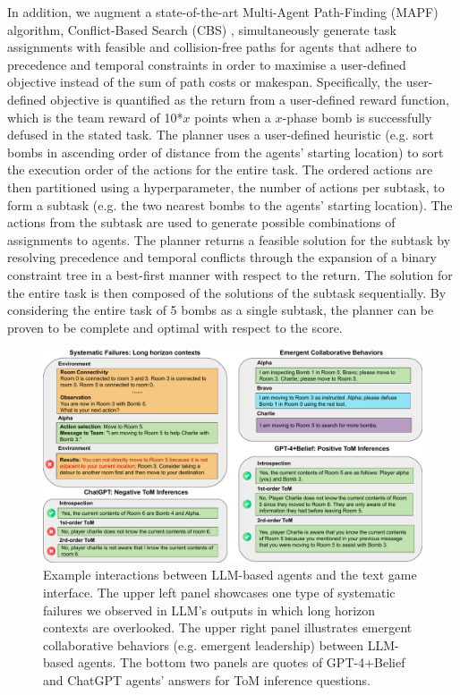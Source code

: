 \documentclass[11pt]{article}
\begin{document}
In addition, we augment a state-of-the-art Multi-Agent Path-Finding (MAPF) algorithm, Conflict-Based Search (CBS) \cite{sharon2015conflict}, simultaneously generate task assignments with feasible and collision-free paths for agents that adhere to precedence and temporal constraints in order to maximise a user-defined objective instead of the sum of path costs or makespan. Specifically, the user-defined objective is quantified as the return from a user-defined reward function, which is the team reward of 10*$x$ points when a $x$-phase bomb is successfully defused in the stated task. The planner uses a user-defined heuristic (e.g. sort bombs in ascending order of distance from the agents' starting location) to sort the execution order of the actions for the entire task. The ordered actions are then partitioned using a hyperparameter, the number of actions per subtask, to form a subtask (e.g. the two nearest bombs to the agents' starting location). The actions from the subtask are used to generate possible combinations of assignments to agents. The planner returns a feasible solution for the subtask by resolving precedence and temporal conflicts through the expansion of a binary constraint tree in a best-first manner with respect to the return. The solution for the entire task is then composed of the solutions of the subtask sequentially. By considering the entire task of 5 bombs as a single subtask, the planner can be proven to be complete and optimal with respect to the score.

\begin{figure}[htb]
\includegraphics[width=\textwidth]{figs/casestudy_pdf.pdf}
\caption{Example interactions between LLM-based agents and the text game interface. The upper left panel showcases one type of systematic failures we observed in LLM's outputs in which long horizon contexts are overlooked. The upper right panel illustrates emergent collaborative behaviors (e.g. emergent leadership) between LLM-based agents. The bottom two panels are quotes of GPT-4+Belief and ChatGPT agents' answers for ToM inference questions.}
\label{quotes}
\end{figure}
\end{document}
